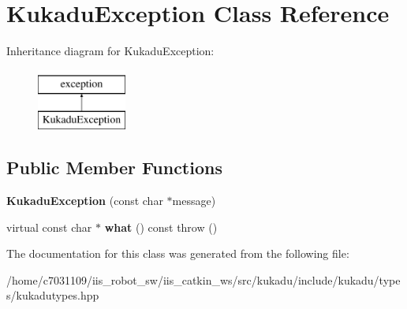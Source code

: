 \hypertarget{classKukaduException}{\section{Kukadu\-Exception Class Reference}
\label{classKukaduException}
}
Inheritance diagram for Kukadu\-Exception\-:\begin{figure}[H]
\begin{center}
\leavevmode
\includegraphics[height=2.000000cm]{classKukaduException}
\end{center}
\end{figure}
\subsection*{Public Member Functions}
\begin{DoxyCompactItemize}
\item 
\hypertarget{classKukaduException_a42b9f7e8168faec423147a324a9da6a8}{{\bfseries Kukadu\-Exception} (const char $\ast$message)}\label{classKukaduException_a42b9f7e8168faec423147a324a9da6a8}

\item 
\hypertarget{classKukaduException_ad5113f32aacb509bf29c9e3e8288b2f5}{virtual const char $\ast$ {\bfseries what} () const   throw ()}\label{classKukaduException_ad5113f32aacb509bf29c9e3e8288b2f5}

\end{DoxyCompactItemize}


The documentation for this class was generated from the following file\-:\begin{DoxyCompactItemize}
\item 
/home/c7031109/iis\-\_\-robot\-\_\-sw/iis\-\_\-catkin\-\_\-ws/src/kukadu/include/kukadu/types/kukadutypes.\-hpp\end{DoxyCompactItemize}
